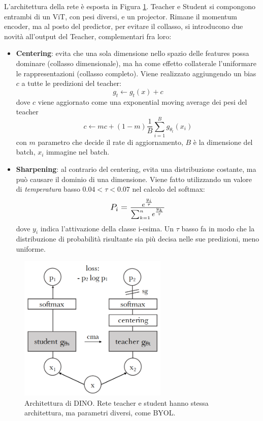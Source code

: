 L'architettura della rete è esposta in Figura \ref{fig:arch_dino}. Teacher e Student si compongono entrambi di un ViT, con pesi diversi, e un projector. Rimane il momentum encoder, ma al posto del predictor, per evitare il collasso, si introducono due novità all'output del Teacher, complementari fra loro:
\begin{itemize}
    \item \textbf{Centering}: evita che una sola dimensione nello spazio delle features possa dominare (collasso dimensionale), ma ha come effetto collaterale l'uniformare le rappresentazioni (collasso completo). Viene realizzato aggiungendo un bias \(c\) a tutte le predizioni del teacher:
    \begin{equation}
    g_t \gets g_t(x) + c
    \end{equation}
    dove \(c\) viene aggiornato come una exponential moving average dei pesi del teacher
    \begin{equation}
    c \gets mc + (1-m)\frac{1}{B}\sum^B_{i=1}g_{\theta_t}(x_i)
    \end{equation}
    con \(m\) parametro che decide il rate di aggiornamento, \(B\) è la dimensione del batch, \(x_i\) immagine nel batch.
    \item \textbf{Sharpening}: al contrario del centering, evita una distribuzione costante, ma può causare il dominio di una dimensione. Viene fatto utilizzando un valore di \textit{temperatura} basso \(0.04 < \tau < 0.07\) nel calcolo del softmax:
    \begin{equation}
    \scalebox{1.2}{$P_i = \frac{e^{\frac{y_i}{\tau}}}{\sum^n_{k=1}e^{\frac{y_k}{\tau}}}$}
    \end{equation}
    dove \(y_i\) indica l'attivazione della classe i-esima. Un \(\tau\) basso fa in modo che la distribuzione di probabilità risultante sia più decisa nelle sue predizioni, meno uniforme.
\end{itemize}

\begin{figure}[t]
    \centering
    \includegraphics[height=70mm]{Immagini/ssl/arch_dino.png}
    \caption{Architettura di DINO. Rete teacher e student hanno stessa architettura, ma parametri diversi, come BYOL.}
    \label{fig:arch_dino}
\end{figure}

